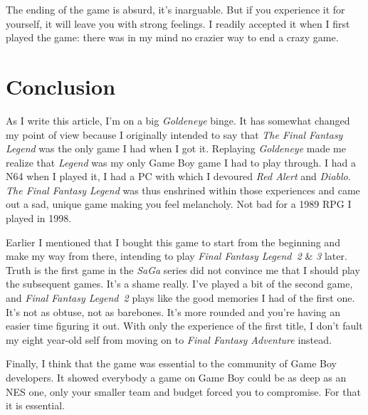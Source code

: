 \documentclass{book}
\begin{document}
The ending of the game is absurd, it’s inarguable. But if you experience it for yourself, it will leave you with strong feelings. I readily accepted it when I first played the game: there was in my mind no crazier way to end a crazy game.

\FloatBarrier\needspace{10mm}\section*{Conclusion}\nopagebreak[4]

As I write this article, I’m on a big \emph{Goldeneye} binge. It has somewhat changed my point of view because I originally intended to say that \emph{The Final Fantasy Legend} was the only game I had when I got it. Replaying \emph{Goldeneye} made me realize that \emph{Legend} was my only Game Boy game I had to play through. I had a N64 when I played it, I had a PC with which I devoured \emph{Red Alert} and \emph{Diablo}. \emph{The Final Fantasy Legend} was thus enshrined within those experiences and came out a sad, unique game making you feel melancholy. Not bad for a 1989 RPG I played in 1998.

Earlier I mentioned that I bought this game to start from the beginning and make my way from there, intending to play \emph{Final Fantasy Legend~2} \& \emph{3} later. Truth is the first game in the \emph{SaGa} series did not convince me that I should play the subsequent games. It’s a shame really. I’ve played a bit of the second game, and \emph{Final Fantasy Legend~2} plays like the good memories I had of the first one. It’s not as obtuse, not as barebones. It’s more rounded and you’re having an easier time figuring it out. With only the experience of the first title, I don’t fault my eight year-old self from moving on to \emph{Final Fantasy Adventure} instead.

Finally, I think that the game was essential to the community of Game Boy developers. It showed everybody a game on Game Boy could be as deep as an NES one, only your smaller team and budget forced you to compromise. For that it is essential.
\end{document}
